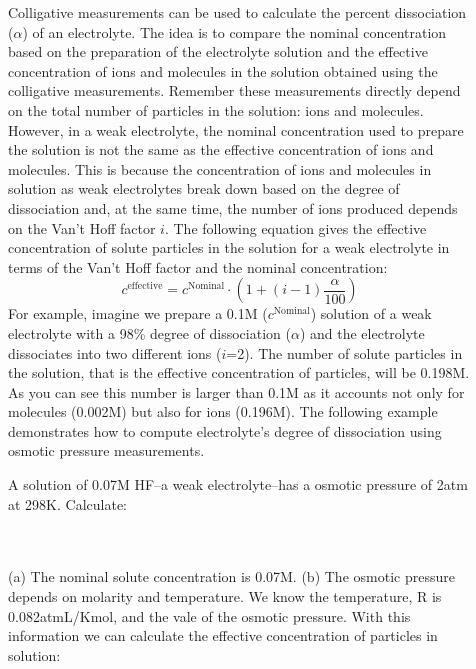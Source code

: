 \documentclass[main.tex]{subfiles}
\begin{document}
\begin{description}
\item[] 
Colligative measurements can be used to calculate the percent dissociation ($\alpha$) of an electrolyte. The idea is to compare the nominal concentration based on the preparation of the electrolyte solution and the effective concentration of ions and molecules in the solution obtained using the colligative measurements. Remember these measurements directly depend on the total number of particles in the solution: ions and molecules.  However, in a weak electrolyte, the nominal concentration used to prepare the solution is not the same as the effective concentration of ions and molecules. This is because the concentration of ions and molecules in solution as weak electrolytes break down based on the degree of dissociation and, at the same time, the number of ions produced depends on the Van't Hoff factor $i$. The following equation gives the effective concentration of solute particles in the solution for a weak electrolyte in terms of the Van't Hoff factor and the nominal concentration:
\[ c^{\text{effective}}=c^{\text{Nominal}}\cdot (1+ (i-1)\frac{\alpha}{100}) \]
For example, imagine we prepare a 0.1M ($c^{\text{Nominal}}$) solution of a weak electrolyte with a 98\% degree of dissociation ($\alpha$) and the electrolyte dissociates into two different ions ($i$=2). The number of solute particles in the solution, that is the effective concentration of particles, will be 0.198M. As you can see this number is larger than 0.1M as it accounts not only for molecules (0.002M) but also for ions (0.196M).
The following example demonstrates how to compute electrolyte's degree of dissociation using osmotic pressure measurements.
  \begin{example} %
A solution of 0.07M HF--a weak electrolyte--has a osmotic pressure of 2atm at 298K. Calculate:
\\
 \\
(a) The nominal solute concentration is 0.07M.
(b) The osmotic pressure depends on molarity and temperature. We know the temperature, R is 0.082atmL/Kmol, and the vale of the osmotic pressure. With this information we can calculate the effective concentration of particles in solution:

\end{example}
\end{description}
\end{document}
